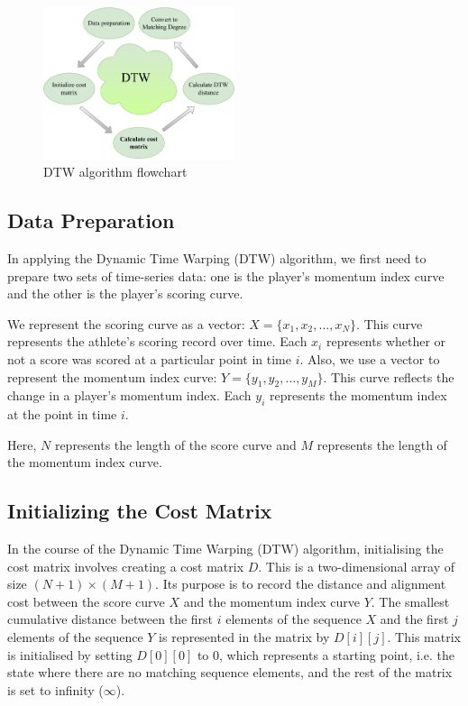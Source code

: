 \documentclass[12pt]{article}  %
\begin{document}
\begin{figure}[h] %
	\centering %
	\includegraphics[width=0.5\textwidth]{picture/第二问的算法流程图.pdf} %
	\caption{DTW algorithm flowchart} %
	\label{fig:6} %
	\end{figure}
\FloatBarrier

\subsection{Data Preparation}

In applying the Dynamic Time Warping (DTW) algorithm, we first need to prepare two sets of time-series data: one is the player's momentum index curve and the other is the player's scoring curve.

We represent the scoring curve as a vector: \(X = \{x_1, x_2, \ldots, x_N\}\). This curve represents the athlete's scoring record over time. Each \(x_i\) represents whether or not a score was scored at a particular point in time \(i\). Also, we use a vector to represent the momentum index curve: \(Y = \{y_1, y_2, \ldots, y_M\}\). This curve reflects the change in a player's momentum index. Each \(y_i\) represents the momentum index at the point in time \(i\).

Here, \(N\) represents the length of the score curve and \(M\) represents the length of the momentum index curve.

\subsection{Initializing the Cost Matrix}

In the course of the Dynamic Time Warping (DTW) algorithm, initialising the cost matrix involves creating a cost matrix \(D\). This is a two-dimensional array of size \((N+1) \times (M+1)\). Its purpose is to record the distance and alignment cost between the score curve \(X\) and the momentum index curve \(Y\). The smallest cumulative distance between the first \(i\) elements of the sequence \(X\) and the first \(j\) elements of the sequence \(Y\) is represented in the matrix by \(D[i][j]\). This matrix is initialised by setting \(D[0][0]\) to 0, which represents a starting point, i.e. the state where there are no matching sequence elements, and the rest of the matrix is set to infinity (\(\infty\)).
\end{document}
